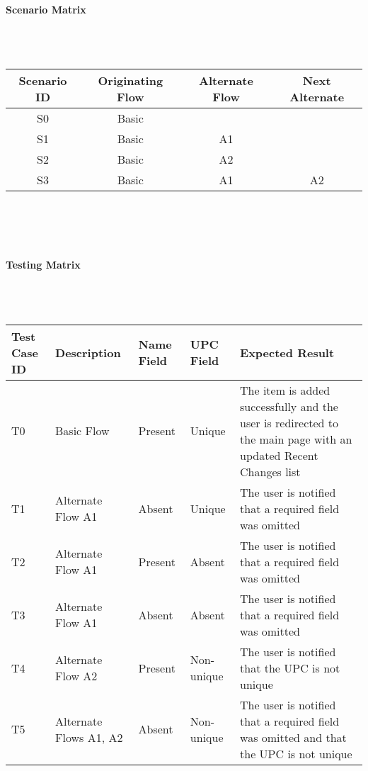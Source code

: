 \documentclass{article}
\begin{document}
\paragraph{Scenario Matrix}~\\ \\
\begin{tabular}{ c  c  c  c }
\hline
Scenario ID & Originating Flow & Alternate Flow & Next Alternate\\
\hline
\hline
S0 & Basic &  & \\
\hline
S1 & Basic & A1 & \\
\hline
S2 & Basic & A2 & \\
\hline
S3 & Basic & A1 & A2\\
\hline
\end{tabular}\\
~\\
~\\
\paragraph{Testing Matrix}~\\ \\
\begin{tabular}{ p{0.5in}  p{1.9in}  p{0.4in}  p{0.7in}  p{2in} }
\hline
Test Case ID & Description & Name Field & UPC Field & Expected Result\\
\hline
\hline
T0 & Basic Flow & Present & Unique & The item is added successfully and the user is redirected to the main page with an updated Recent Changes list\\
\hline
T1 & Alternate Flow A1 & Absent & Unique & The user is notified that a required field was omitted\\
\hline
T2 & Alternate Flow A1 & Present & Absent & The user is notified that a required field was omitted\\
\hline
T3 & Alternate Flow A1 & Absent & Absent & The user is notified that a required field was omitted\\
\hline
T4 & Alternate Flow A2 & Present & Non-unique & The user is notified that the UPC is not unique\\
\hline
T5 & Alternate Flows A1, A2 & Absent & Non-unique & The user is notified that a required field was omitted and that the UPC is not unique\\
\hline
\end{tabular}\\
~\\
~\\
\end{document}

